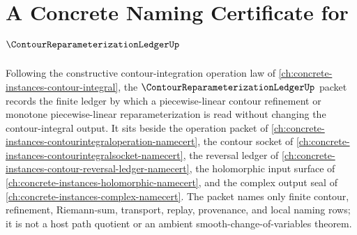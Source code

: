 \chapter{A Concrete Naming Certificate for $\ContourReparameterizationLedgerUp$}
\label{ch:concrete-instances-contour-reparameterization-ledger-namecert}

Following the constructive contour-integration operation law of \autoref{ch:concrete-instances-contour-integral}, the $\ContourReparameterizationLedgerUp$ packet records the finite ledger by which a piecewise-linear contour refinement or monotone piecewise-linear reparameterization is read without changing the contour-integral output. It sits beside the operation packet of \autoref{ch:concrete-instances-contourintegraloperation-namecert}, the contour socket of \autoref{ch:concrete-instances-contourintegralsocket-namecert}, the reversal ledger of \autoref{ch:concrete-instances-contour-reversal-ledger-namecert}, the holomorphic input surface of \autoref{ch:concrete-instances-holomorphic-namecert}, and the complex output seal of \autoref{ch:concrete-instances-complex-namecert}. The packet names only finite contour, refinement, Riemann-sum, transport, replay, provenance, and local naming rows; it is not a host path quotient or an ambient smooth-change-of-variables theorem.

